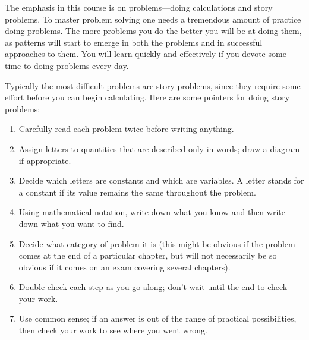 The emphasis in this course is on problems---doing calculations and story
problems.  To master problem solving one needs a tremendous amount of
practice doing problems. The more problems you do the better you will
be at doing them, as patterns will start to emerge in both the
problems and in successful approaches to them. You will learn quickly and effectively
 if you devote some time to doing problems every day.

Typically the most difficult problems are story problems, since they
require some effort before you can begin calculating.
Here are some pointers for doing story problems:

\begin{enumerate}

\item
Carefully read each problem twice before writing anything.

\item 
Assign letters to quantities that are described only in words;
draw a diagram if appropriate.

\item
Decide which letters are constants and which are variables.  A letter
stands for a constant if its value remains the same throughout the problem.

\item
Using mathematical notation, write down what you know and then write down
what you want to find.

\item
Decide what category of problem it is (this might be obvious if the
problem comes at the end of a particular chapter, but will not necessarily
be so obvious if it comes on an exam covering several chapters).

\item
Double check each step as you go along; don't wait until the end to
check your work.

\item
Use common sense; if an answer is out of the range of practical
possibilities, then check your work to see where you went wrong.

\end{enumerate}